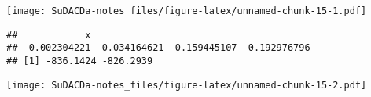 \documentclass[]{book}
\newenvironment{Shaded}{\begin{snugshade}}{\end{snugshade}}
\newcommand{\KeywordTok}[1]{\textcolor[rgb]{0.13,0.29,0.53}{\textbf{{#1}}}}
\newcommand{\DataTypeTok}[1]{\textcolor[rgb]{0.13,0.29,0.53}{{#1}}}
\newcommand{\DecValTok}[1]{\textcolor[rgb]{0.00,0.00,0.81}{{#1}}}
\newcommand{\StringTok}[1]{\textcolor[rgb]{0.31,0.60,0.02}{{#1}}}
\newcommand{\NormalTok}[1]{{#1}}
\theoremstyle{definition}
\theoremstyle{definition}
\theoremstyle{definition}
\theoremstyle{remark}
\begin{document}
\texttt{[image: SuDACDa-notes\_files/figure-latex/unnamed-chunk-15-1.pdf]}

\begin{Shaded}
\end{Shaded}

\begin{verbatim}
##            x                                        
## -0.002304221 -0.034164621  0.159445107 -0.192976796 
## [1] -836.1424 -826.2939
\end{verbatim}

\texttt{[image: SuDACDa-notes\_files/figure-latex/unnamed-chunk-15-2.pdf]}
\end{document}
